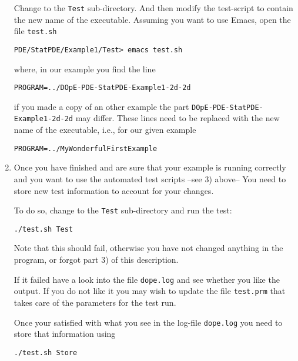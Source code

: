 \begin{enumerate}
  Change to the \texttt{Test} sub-directory. And then modify the
  test-script to contain the new name of the executable.
  Assuming you want to use Emacs, open the file \texttt{test.sh}
\begin{verbatim}
PDE/StatPDE/Example1/Test> emacs test.sh
\end{verbatim}
  where, in our example you find the line
\begin{verbatim}
PROGRAM=../DOpE-PDE-StatPDE-Example1-2d-2d
\end{verbatim} 
  if you made a copy of an other example the part \texttt{DOpE-PDE-StatPDE-Example1-2d-2d}
  may differ. These lines need to be replaced with the new name of the 
  executable, i.e., for our given example
\begin{verbatim}
PROGRAM=../MyWonderfulFirstExample
\end{verbatim} 
    
\item Once you have finished and are sure that your example is running correctly
  and you want to use the automated test scripts --see 3) above-- You need 
  to store new test information to account for your changes. 
  
  To do so, change to the \texttt{Test} sub-directory and run the test:
\begin{verbatim}
./test.sh Test
\end{verbatim}
  Note that this should fail, otherwise you have not changed anything in the program, 
  or forgot part 3) of this description.
  
  If it failed have a look into the file \texttt{dope.log} and see whether you like the 
  output. If you do not like it you may wish to update the file \texttt{test.prm} that 
  takes care of the parameters for the test run.
  
  Once your satisfied with what you see in the log-file \texttt{dope.log} you need to store 
  that information using
\begin{verbatim}
./test.sh Store
\end{verbatim}
\end{enumerate}


